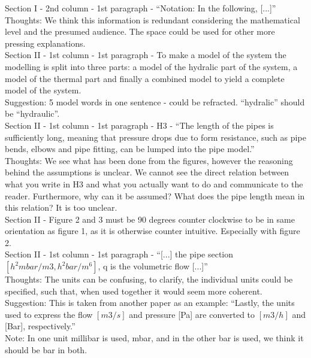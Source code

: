 \noindent Section I - 2nd column - 1st paragraph - “Notation: In the following, [...]”\\
Thoughts: We think this information is redundant considering the mathematical level and the presumed audience. The space could be used for other more pressing explanations.\\


\noindent Section II - 1st column - 1st paragraph - To make a model of the system the modelling is split into three parts: a model of the hydralic part of the system, a model of the thermal part and finally a combined model to yield a complete model of the system.\\
Suggestion: 5 model words in one sentence - could be refracted. “hydralic” should be “hydraulic”.\\


\noindent Section II - 1st column - 1st paragraph - H3 - “The length of the pipes is sufficiently long, meaning that pressure drops due to form resistance, such as pipe bends, elbows and pipe fitting, can be lumped into the pipe model.”\\
Thoughts: We see what has been done from the figures, however the reasoning behind the assumptions is unclear. We cannot see the direct relation between what you write in H3 and what you actually want to do and communicate to the reader. Furthermore, why can it be assumed? What does the pipe length mean in this relation? It is too unclear.\\


\noindent Section II - Figure 2 and 3 must be 90 degrees counter clockwise to be in same orientation as figure 1, as it is otherwise counter intuitive. Especially with figure 2.\\


\noindent Section II - 1st column - 1st paragraph - “[...] the pipe section $[h^2 mbar / m3, h^2 bar/m^6]$, q is the volumetric flow  [...]”\\
Thoughts: The units can be confusing, to clarify, the individual units could be specified, such that, when used together it would seem more coherent.\\
Suggestion: This is taken from another paper as an example: “Lastly, the units used to express the flow $[m3/s]$ and pressure [Pa] are converted to $[m3/h]$ and [Bar], respectively.”\\
Note: In one unit millibar is used, mbar, and in the other bar is used, we think it should be bar in both.\\


